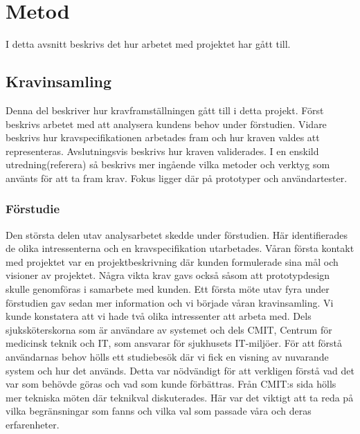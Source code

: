 \documentclass{article}
\begin{document}
 
\section{Metod}
I detta avsnitt beskrivs det hur arbetet med projektet har gått till.
\subsection{Kravinsamling}


Denna del beskriver hur kravframställningen gått till i detta projekt. Först beskrivs arbetet med att analysera kundens behov under förstudien. Vidare beskrivs hur kravspecifikationen arbetades fram och hur kraven valdes att representeras. Avslutningsvis beskrivs hur kraven validerades. I en enskild utredning(referera) så beskrivs mer ingående vilka metoder och verktyg som använts för att ta fram krav. Fokus ligger där på prototyper och användartester.

\subsubsection{Förstudie}
Den största delen utav analysarbetet skedde under förstudien. Här identifierades de olika intressenterna och en kravspecifikation utarbetades. Våran första kontakt med projektet var en projektbeskrivning där kunden formulerade sina mål och visioner av projektet. Några vikta krav gavs också såsom att prototypdesign skulle genomföras i samarbete med kunden. Ett första möte utav fyra under förstudien gav sedan mer information och vi började våran kravinsamling. Vi kunde konstatera att vi hade två olika intressenter att arbeta med. Dels sjuksköterskorna som är användare av systemet och dels CMIT, Centrum för medicinsk teknik och IT, som ansvarar för sjukhusets IT-miljöer. För att förstå användarnas behov hölls ett studiebesök där vi fick en visning av nuvarande system och hur det används. Detta var nödvändigt för att verkligen förstå vad det var som behövde göras och vad som kunde förbättras. Från CMIT:s sida hölls mer tekniska möten där teknikval diskuterades. Här var det viktigt att ta reda på vilka begränsningar som fanns och vilka val som passade våra och deras erfarenheter.
\end{document}
